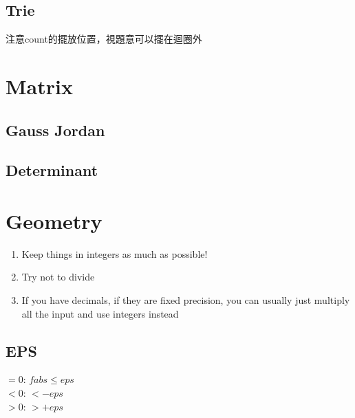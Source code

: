 \documentclass[10pt,oneside]{article}
\begin{document}
\begin{landscape}
\begin{multicols}{2}
\subsection{Trie}
注意count的擺放位置，視題意可以擺在迴圈外


\section{Matrix}

\subsection{Gauss Jordan}


\subsection{Determinant}




\section{Geometry}

\begin{enumerate}
	\item Keep things in integers as much as possible!
	\item Try not to divide
	\item If you have decimals, if they are fixed precision, you can usually just multiply all the input and use integers instead
\end{enumerate}

\subsection{EPS}


$=0$: $fabs \leq eps$\\
$<0$: $ < -eps$\\
$>0$: $ > +eps$


\end{multicols}
\end{landscape}
\end{document}
